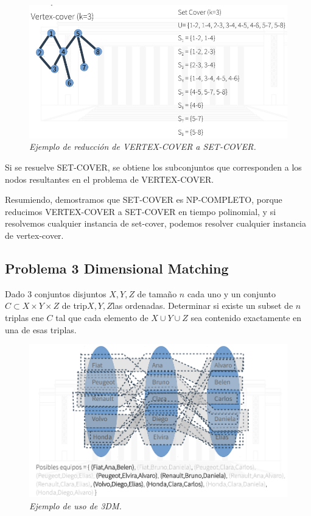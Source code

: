 \documentclass{article}
\begin{document}
\begin{figure}[h!]
    \begin{center} 
    \includegraphics[width=\linewidth]{imagenes/ejemplo-set-cover.png}
    \caption{\small \sl Ejemplo de reducción de VERTEX-COVER a SET-COVER.\label{fig:Stupendous}} 
    \end{center}
\end{figure}

Si se resuelve SET-COVER, se obtiene los subconjuntos que corresponden a los nodos resultantes en el 
problema de VERTEX-COVER.

Resumiendo, demostramos que SET-COVER es NP-COMPLETO, porque reducimos VERTEX-COVER a SET-COVER en tiempo
polinomial, y si resolvemos cualquier instancia de set-cover, podemos resolver cualquier instancia
de vertex-cover.

\newpage
\subsection{Problema 3 Dimensional Matching}

Dado 3 conjuntos disjuntos \(X, Y, Z\) de tamaño \(n\) 
cada uno y un conjunto \(C \subset X \times Y \times Z\) de trip\(X, Y, Z\)las ordenadas. Determinar si existe
un subset de \(n\) triplas ene \(C\) tal que cada elemento de \(X \cup Y \cup Z\) sea contenido
exactamente en una de esas triplas.

\begin{figure}[h!]
    \begin{center} 
    \includegraphics[width=\linewidth]{imagenes/ejemplo-3DM.png}
    \caption{\small \sl Ejemplo de uso de 3DM.\label{fig:ejm3dm}} 
    \end{center}
\end{figure}
\end{document}
